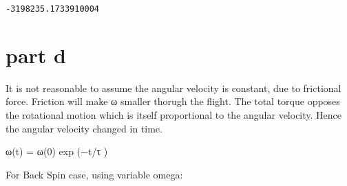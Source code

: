 \documentclass[11pt]{article}
\begin{document}
    \begin{Verbatim}[commandchars=\\\{\}]
-3198235.1733910004

    \end{Verbatim}

    \hypertarget{part-d}{%
\section{part d}\label{part-d}}

    It is not reasonable to assume the angular velocity is constant, due to
frictional force. Friction will make ω smaller thorugh the flight. The
total torque opposes the rotational motion which is itself proportional
to the angular velocity. Hence the angular velocity changed in time.

ω(t) = ω(0) exp (−t/τ )

For Back Spin case, using variable omega:
\end{document}
